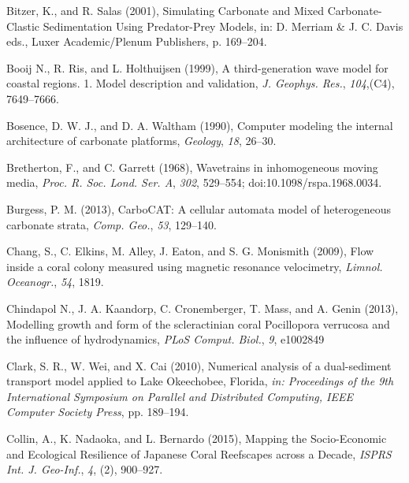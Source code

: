 \documentclass[default,jgrga]{agutex2015}
\begin{document}
\begin{article}
\begin{thebibliography}{}
Bitzer, K., and R. Salas (2001), Simulating Carbonate and Mixed Carbonate-Clastic Sedimentation Using Predator-Prey Models, in: D. Merriam \& J. C. Davis eds., Luxer Academic/Plenum Publishers, p. 169--204.

Booij N., R. Ris, and L. Holthuijsen (1999), A third-generation wave model for coastal regions. 1. Model description and validation, \textit{J. Geophys. Res.}, \textit{104},(C4), 7649--7666.

Bosence, D. W. J., and D. A. Waltham (1990), Computer modeling the internal architecture of carbonate platforms, \textit{Geology}, \textit{18}, 26--30.

Bretherton, F., and C. Garrett (1968), Wavetrains in inhomogeneous moving media, \textit{Proc. R. Soc. Lond. Ser. A}, \textit{302}, 529--554; doi:10.1098/rspa.1968.0034.

Burgess, P. M. (2013), CarboCAT: A cellular automata model of heterogeneous carbonate strata, \textit{Comp. Geo.}, \textit{53}, 129--140.

Chang, S., C. Elkins, M. Alley, J. Eaton, and S. G. Monismith (2009), Flow inside a coral colony measured using magnetic
resonance velocimetry, \textit{Limnol. Oceanogr.}, \textit{54}, 1819.

Chindapol N., J. A. Kaandorp, C. Cronemberger, T. Mass, and A. Genin (2013), Modelling growth and form of the scleractinian coral Pocillopora verrucosa and the influence of hydrodynamics, \textit{PLoS Comput. Biol.}, \textit{9}, e1002849

Clark, S. R., W. Wei, and X. Cai (2010), Numerical analysis of a dual-sediment transport model applied to Lake Okeechobee, Florida, \textit{in: Proceedings of the 9th International Symposium on Parallel and Distributed Computing, IEEE Computer Society Press}, pp. 189--194.

Collin, A., K. Nadaoka, and L. Bernardo (2015), Mapping the Socio-Economic and Ecological Resilience of Japanese Coral Reefscapes across a Decade, \textit{ISPRS Int. J. Geo-Inf.}, \textit{4}, (2), 900--927.


\end{thebibliography}
\end{article}
\end{document}
